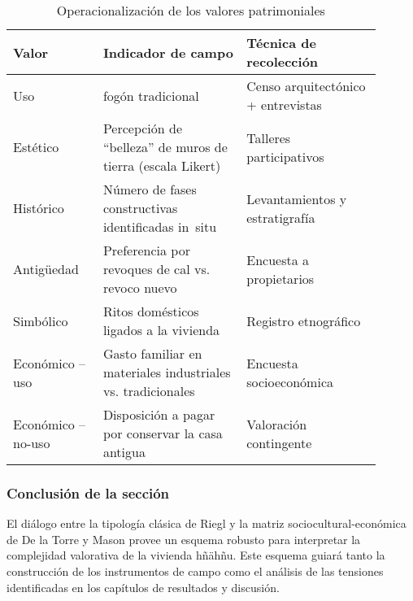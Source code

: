 \begin{table}[ht]
	\centering
	\caption{Operacionalización de los valores patrimoniales}
	\vspace{0.25cm}
	\label{tab:operacionalizacion_valores}
	\begin{tabular}{p{0.22\linewidth} p{0.35\linewidth} p{0.33\linewidth}}
		\toprule
		\textbf{Valor}        & \textbf{Indicador de campo}                      & \textbf{Técnica de
		recolección}                                                                                  \\
		\midrule
		Uso                   &                                                                       %
		fogón tradicional     & Censo arquitectónico +
		entrevistas                                                                                   \\
		Estético              & Percepción de ``belleza'' de muros de tierra
		(escala Likert)       & Talleres participativos                                               \\
		Histórico             & Número de fases constructivas
		identificadas in~situ & Levantamientos y
		estratigrafía                                                                                 \\
		Antigüedad            & Preferencia por revoques de cal vs. revoco nuevo & Encuesta a
		propietarios                                                                                  \\
		Simbólico             & Ritos domésticos ligados a la vivienda           & Registro
		etnográfico                                                                                   \\
		Económico – uso       & Gasto familiar en materiales industriales vs.
		tradicionales         & Encuesta socioeconómica                                               \\
		Económico – no-uso    & Disposición a pagar por conservar la casa
		antigua               & Valoración contingente                                                \\
		\bottomrule
	\end{tabular}
\end{table}

\subsubsection{Conclusión de la sección}

El diálogo entre la tipología clásica de Riegl y la matriz
sociocultural-económica de De la Torre y Mason provee un esquema robusto
para interpretar la complejidad valorativa de la vivienda hñähñu.  Este
esquema guiará tanto la construcción de los instrumentos de campo como
el análisis de las tensiones identificadas en los capítulos de
resultados y discusión.

